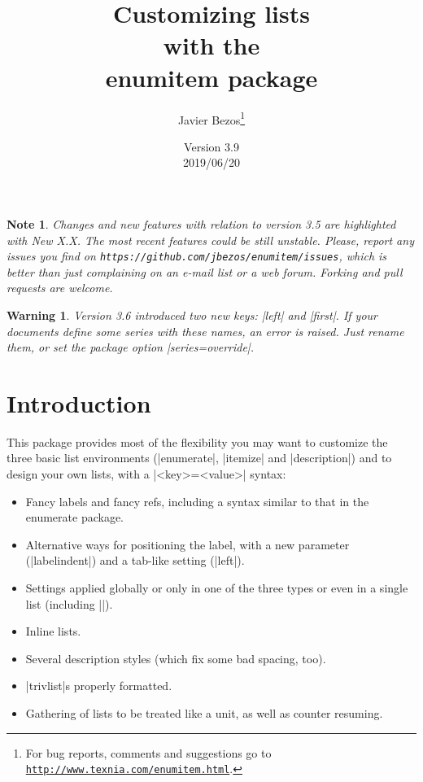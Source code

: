 \documentclass[a4paper]{ltxguide}
\title{Customizing lists\\with the\\\textsf{enumitem} package}
\author{Javier Bezos\footnote{For bug reports, comments and
suggestions go to \href{http://www.texnia.com/enumitem.html}%
{\texttt{http://www.texnia.com/enumitem.html}}.}}
\date{Version 3.9\\2019/06/20}
\newtheorem{warning}{Warning}
\newtheorem{note}{Note}
\newcommand\New[1]{%
  \colorbox[rgb]{.87, .9, .83}{New #1}\enspace\ignorespaces}
\begin{document}
\maketitle
\tableofcontents

\newpage

\vspace*{1cm}

\begin{note}
  Changes and new features with relation to version 3.5 are highlighted
  with \New{X.X}\hspace{-.5em}. The most recent features could be still
  unstable. Please, report any issues you find on
  \texttt{https://github.com/jbezos/enumitem/issues}, which is better
  than just complaining on an e-mail list or a web forum. Forking
  and pull requests are welcome.
\end{note}

\begin{warning}
  Version 3.6 introduced two new keys: |left| and |first|. If your
  documents define some series with these names, an error is raised.
  Just rename them, or set the package option |series=override|.
\end{warning}

\section{Introduction}

This package provides most of the flexibility you may want to customize
the three basic list environments (|enumerate|, |itemize| and
|description|) and to design your own lists, with a |<key>=<value>|
syntax:
\begin{itemize}
\item Fancy labels and fancy refs, including a syntax similar to that
in the \textsf{enumerate} package.

\item Alternative ways for positioning the label, with a new 
  parameter (|labelindent|) and a tab-like setting (|left|).

\item Settings applied globally or only in one of the three types or
even in a single list (including |\topsep|).

\item Inline lists.

\item Several description styles (which fix some bad spacing, too).

\item |trivlist|s properly formatted.

\item Gathering of lists to be treated like a unit, as well as counter 
resuming.

\end{itemize}
\end{document}
